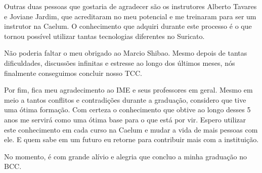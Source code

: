 \documentclass[titlepage,a4paper]{article}
\newcommand{\suricato}{Suricato}
\begin{document}
Outras duas pessoas que gostaria de agradecer são os instrutores Alberto Tavares e Joviane Jardim, que acreditaram no meu potencial e me treinaram para ser um instrutor na Caelum. O conhecimento que adquiri durante este processo é o que tornou possível utilizar tantas tecnologias diferentes no \suricato{}.

Não poderia faltar o meu obrigado ao Marcio Shibao. Mesmo depois de tantas dificuldades, discussões infinitas e estresse ao longo dos últimos meses, nós finalmente conseguimos concluir nosso TCC.

Por fim, fica meu agradecimento ao IME e seus professores em geral. Mesmo em meio a tantos conflitos e contradições durante a graduação, considero que tive uma ótima formação. Com certeza o conhecimento que obtive ao longo desses 5 anos me servirá como uma ótima base para o que está por vir. Espero utilizar este conhecimento em cada curso na Caelum e mudar a vida de mais pessoas com ele. E quem sabe em um futuro eu retorne para contribuir mais com a instituição.

No momento, é com grande alívio e alegria que concluo a minha graduação no BCC.
\end{document}
